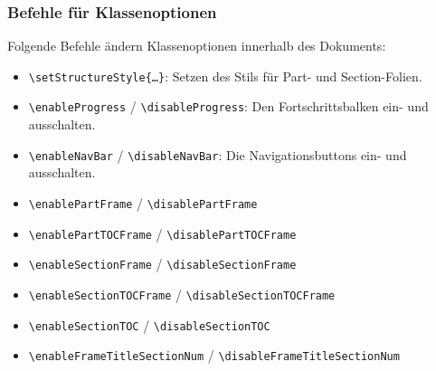 \documentclass[german,notoc,draft]{tudbeamer}%
\begin{document}
\begin{frame}[fragile]
	\frametitle{Befehle für Klassenoptionen}
	Folgende Befehle ändern Klassenoptionen innerhalb des Dokuments:
	\begin{itemize}
		\item \texttt{\textbackslash setStructureStyle\{\dots\}}: Setzen des Stils für Part- und Section-Folien.
		\item \texttt{\textbackslash enableProgress} / \texttt{\textbackslash disableProgress}: Den Fortschrittsbalken ein- und ausschalten.
		\item \texttt{\textbackslash enableNavBar} / \texttt{\textbackslash disableNavBar}: Die Navigationsbuttons ein- und ausschalten.
		\item \texttt{\textbackslash enablePartFrame} / \texttt{\textbackslash disablePartFrame}
		\item \texttt{\textbackslash enablePartTOCFrame} / \texttt{\textbackslash disablePartTOCFrame}
		\item \texttt{\textbackslash enableSectionFrame} / \texttt{\textbackslash disableSectionFrame}
		\item \texttt{\textbackslash enableSectionTOCFrame} / \texttt{\textbackslash disableSectionTOCFrame}
		\item \texttt{\textbackslash enableSectionTOC} / \texttt{\textbackslash disableSectionTOC}
		\item \texttt{\textbackslash enableFrameTitleSectionNum} / \texttt{\textbackslash disableFrameTitleSectionNum}
	\end{itemize}
\end{frame}
\end{document}
